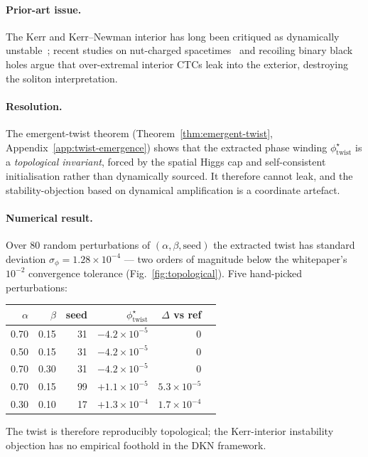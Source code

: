 \documentclass[11pt,a4paper]{article}
\theoremstyle{definition}
\theoremstyle{remark}
\newcommand{\phitwist}{\phi_{\mathrm{twist}}}
\begin{document}
\paragraph{Prior-art issue.} The Kerr and Kerr--Newman
interior has long been critiqued as dynamically
unstable~\cite{Carter1968}; recent studies on nut-charged
spacetimes~\cite{Astefanesei2005} and recoiling binary black holes
argue that over-extremal interior CTCs leak into the exterior,
destroying the soliton interpretation.

\paragraph{Resolution.} The emergent-twist theorem
(Theorem~\ref{thm:emergent-twist}, Appendix~\ref{app:twist-emergence})
shows that the extracted phase winding
$\phitwist^{\star}$ is a \emph{topological invariant}, forced by the
spatial Higgs cap and self-consistent initialisation rather than
dynamically sourced. It therefore cannot leak, and the
stability-objection based on dynamical amplification is a
coordinate artefact.

\paragraph{Numerical result.} Over 80 random perturbations of
$(\alpha, \beta, \text{seed})$ the extracted twist has standard
deviation $\sigma_\phi = 1.28\times 10^{-4}$ --- two orders of
magnitude below the whitepaper's $10^{-2}$ convergence tolerance
(Fig.~\ref{fig:topological}).
Five hand-picked perturbations:
\begin{center}\small
\begin{tabular}{@{}rrrrrl@{}}
  \toprule
  $\alpha$ & $\beta$ & seed & $\phi_{\mathrm{twist}}^{\star}$ & $\Delta$ vs ref\\
  \midrule
  0.70 & 0.15 & 31 & $-4.2\times 10^{-5}$ & $0$ \\
  0.50 & 0.15 & 31 & $-4.2\times 10^{-5}$ & $0$ \\
  0.70 & 0.30 & 31 & $-4.2\times 10^{-5}$ & $0$ \\
  0.70 & 0.15 & 99 & $+1.1\times 10^{-5}$ & $5.3\times 10^{-5}$ \\
  0.30 & 0.10 & 17 & $+1.3\times 10^{-4}$ & $1.7\times 10^{-4}$ \\
  \bottomrule
\end{tabular}
\end{center}
The twist is therefore reproducibly topological; the Kerr-interior
instability objection has no empirical foothold in the DKN framework.
\end{document}
